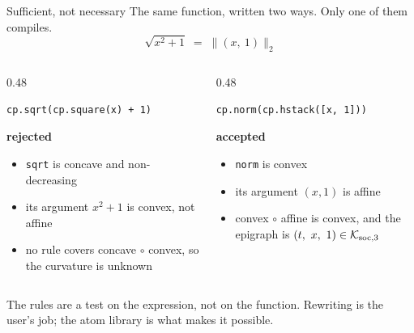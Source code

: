 \documentclass[10pt,mathserif,aspectratio=169]{beamer}
\begin{document}
\begin{frame}[fragile,label=bk-nondcp]{Sufficient, not necessary}
\vspace{-0.5ex}
{\small The same function, written two ways. Only one of them compiles.}
\vspace{0.5ex}
\[
  \sqrt{x^2 + 1} \;=\; \bigl\| (x,\ 1) \bigr\|_2
\]
\vspace{-2ex}
\begin{columns}[T,onlytextwidth]
\begin{column}{0.48\textwidth}
\begin{lstlisting}[language=mypython, basicstyle=\ttfamily\scriptsize,
                   aboveskip=0.4em, belowskip=0.4em]
cp.sqrt(cp.square(x) + 1)
\end{lstlisting}
\vspace{0.5ex}
{\footnotesize\color{polyblue}\textbf{rejected}}
\begin{itemize}\footnotesize
  \item \texttt{sqrt} is concave and non-decreasing
  \item its argument $x^2 + 1$ is convex, not affine
  \item no rule covers concave $\circ$ convex, so the curvature is unknown
\end{itemize}
\end{column}
\begin{column}{0.48\textwidth}
\begin{lstlisting}[language=mypython, basicstyle=\ttfamily\scriptsize,
                   aboveskip=0.4em, belowskip=0.4em]
cp.norm(cp.hstack([x, 1]))
\end{lstlisting}
\vspace{0.5ex}
{\footnotesize\color{polyblue}\textbf{accepted}}
\begin{itemize}\footnotesize
  \item \texttt{norm} is convex
  \item its argument $(x, 1)$ is affine
  \item convex $\circ$ affine is convex, and the epigraph is
        $(t,\ x,\ 1) \in \cone{K}_{\mathrm{soc},3}$
\end{itemize}
\end{column}
\end{columns}

\vspace{1.5ex}
\begin{center}\small
The rules are a test on the expression, not on the function. Rewriting is the user's job; the
atom library is what makes it possible.
\end{center}
\end{frame}
\end{document}
